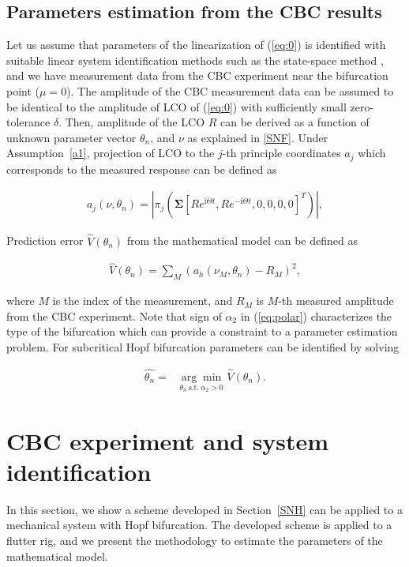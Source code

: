 \documentclass[openacc]{rsproca_new}%
\def\vec#1{\ensuremath{\mathbf{#1}}}
\newcommand{\Eref}[1]{(\ref{#1})}
\newcommand{\Sref}[1]{Section~\ref{#1}}
\newcommand{\asref}[1]{Assumption~\ref{#1}}
\begin{document}
\subsection{Parameters estimation from the CBC results}\label{NSI}
Let us assume that parameters of the linearization of \Eref{eq:0} is identified with suitable linear system identification methods such as the state-space method \cite{ljung2001system}, and we have measurement data from the CBC experiment near the bifurcation point ($\mu=0$). The amplitude of the CBC measurement data can be assumed to be identical to the amplitude of LCO of \Eref{eq:0} with sufficiently small zero-tolerance $\delta$. Then, amplitude of the LCO $R$ can be derived as a function of unknown parameter vector $\theta_n$, and $\nu$ as explained in \ref{SNF}. Under \asref{a1}, projection of LCO to the $j$-th principle coordinates $a_j$ which corresponds to the measured response can be defined as

\begin{align}\label{NSI-1}
a_j(\nu,\theta_n)=|\pi_j (\vec{\Sigma}[Re^{\textrm{i}\dot \Theta t},Re^{-\textrm{i}\dot \Theta t},0,0,0,0]^T)|,
\end{align}

\noindent Prediction error $\hat{V}(\theta_n)$ from the mathematical model can be defined as

\begin{align}\label{NSI-2}
\hat{V}(\theta_n)=\sum_M (a_h(\nu_M,\theta_n)-R_M)^2,
\end{align}

\noindent where $M$ is the index of the measurement, and $R_M$ is $M$-th measured amplitude from the CBC experiment. Note that sign of $\alpha_2$ in \Eref{eq:polar} characterizes the type of the bifurcation which can provide a constraint to a parameter estimation problem. For subcritical Hopf bifurcation parameters can be identified by solving

\begin{align}\label{NSI-3}
\hat{\theta_n}=&\underset{\theta_n \: \textrm{s.t.} \: \alpha_2>0} {\arg\min} \: \hat V(\theta_n).
\end{align}

\section{CBC experiment and system identification}
In this section, we show a scheme developed in \Sref{SNH} can be applied to a mechanical system with Hopf bifurcation. The developed scheme is applied to a flutter rig, and we present the methodology to estimate the parameters of the mathematical model.
\end{document}
